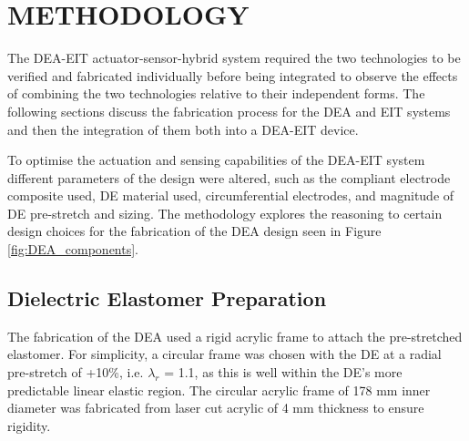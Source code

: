 



\section{METHODOLOGY} %
\label{sec:method}
The DEA-EIT actuator-sensor-hybrid system required the two technologies to be verified and fabricated individually before being integrated to observe the effects of combining the two technologies relative to their independent forms. The following sections discuss the fabrication process for the DEA and EIT systems and then the integration of them both into a DEA-EIT device.

To optimise the actuation and sensing capabilities of the DEA-EIT system different parameters of the design were altered, such as the compliant electrode composite used, DE material used, circumferential electrodes, and magnitude of DE pre-stretch and sizing. The methodology explores the reasoning to certain design choices for the fabrication of the DEA design seen in Figure \ref{fig:DEA_components}.


\subsection{Dielectric Elastomer Preparation}
\label{subsec:de_fab}
The fabrication of the DEA used a rigid acrylic frame to attach the pre-stretched elastomer. For simplicity, a circular frame was chosen with the DE at a radial pre-stretch of +10\%, i.e. $\lambda_r$ = 1.1, as this is well within the DE's more predictable linear elastic region. The circular acrylic frame of 178 mm inner diameter was fabricated from laser cut acrylic of 4 mm thickness to ensure rigidity.


